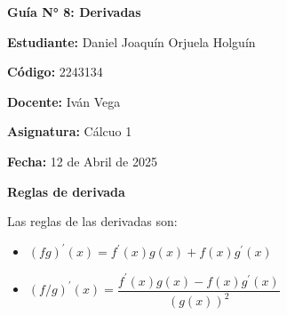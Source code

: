 \documentclass{article}
\begin{document}
\begin{center}
    \Large \textbf{Guía N° 8: Derivadas} 
\end{center}

\vspace{1em}

\textbf{Estudiante:} Daniel Joaquín Orjuela Holguín

\textbf{Código:} 2243134

\textbf{Docente:} Iván Vega

\textbf{Asignatura:} Cálcuo 1

\textbf{Fecha:} 12 de Abril de 2025
\vspace{2em}
\begin{center}
    \Large \textbf{Reglas de derivada}
\end{center}  
    Las reglas de las derivadas son:
    \begin{itemize}
        \item $(fg)^{\prime}(x) = f^{\prime}(x)g(x) + f(x)g^{\prime}(x)$
        \item $(f/g)^{\prime}(x) = \dfrac{f^{\prime}(x)g(x) - f(x)g^{\prime}(x)}{(g(x))^2}$
    \end{itemize}
\vspace{0.5em}
\end{document}
